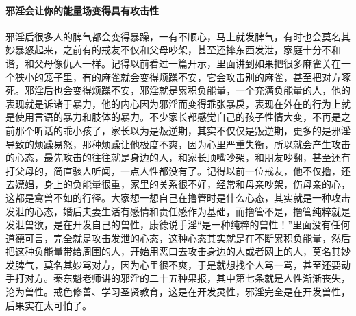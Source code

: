 \paragraph{邪淫会让你的能量场变得具有攻击性}

邪淫后很多人的脾气都会变得暴躁，一有不顺心，马上就发脾气，有时也会莫名其妙暴怒起来，之前有的戒友不仅和父母吵架，甚至还摔东西发泄，家庭十分不和谐，和父母像仇人一样。记得以前看过一篇开示，里面讲到如果把很多麻雀关在一个狭小的笼子里，有的麻雀就会变得烦躁不安，它会攻击别的麻雀，甚至把对方啄死。邪淫后也会变得烦躁不安，邪淫就是累积负能量，一个充满负能量的人，他的表现就是诉诸于暴力，他的内心因为邪淫而变得乖张暴戾，表现在外在的行为上就是使用言语的暴力和肢体的暴力。不少家长都感觉自己的孩子性情大变，不再是之前那个听话的乖小孩了，家长以为是叛逆期，其实不仅仅是叛逆期，更多的是邪淫导致的烦躁易怒，那种烦躁让他极度不爽，因为心里严重失衡，所以就会产生攻击的心态，最先攻击的往往就是身边的人，和家长顶嘴吵架，和朋友吵翻，甚至还有打父母的，简直骇人听闻，一点人性都没有了。记得以前一位戒友，他不仅撸，还去嫖娼，身上的负能量很重，家里的关系很不好，经常和母亲吵架，伤母亲的心，这都是禽兽不如的行径。大家想一想自己在撸管时是什么心态，其实就是一种攻击发泄的心态，婚后夫妻生活有感情和责任感作为基础，而撸管不是，撸管纯粹就是发泄兽欲，是在开发自己的兽性，康德说手淫“是一种纯粹的兽性！”里面没有任何道德可言，完全就是攻击发泄的心态，这种心态其实就是在不断累积负能量，然后把这种负能量带给周围的人，开始用恶口去攻击身边的人或者网上的人，莫名其妙发脾气，莫名其妙骂对方，因为心里很不爽，于是就想找个人骂一骂，甚至还要动手打对方。秦东魁老师讲的邪淫的二十五种果报，其中第七条就是人性渐渐丧失，沦为兽性。戒色修善、学习圣贤教育，这是在开发灵性，邪淫完全是在开发兽性，后果实在太可怕了。

